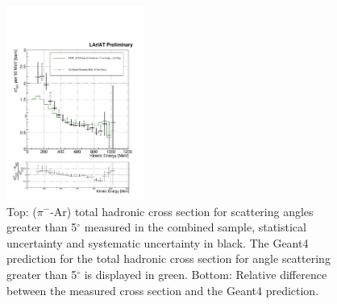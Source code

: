 \documentclass[aps,prl,twocolumn,showpacs,superscriptaddress,groupedaddress]{revtex4}  %
\begin{document}
\begin{figure}
\includegraphics[width =0.4\textwidth ]{TheRealMoneyPlot}
\caption{\label{fig:epsart} Top: ($\pi^-$-Ar) total hadronic cross section for  scattering angles greater than 5$^\circ$ measured in the combined sample, statistical uncertainty and systematic uncertainty in black. The Geant4 prediction for the total hadronic cross section for angle scattering greater than 5$^\circ$ is displayed in green. Bottom: Relative difference between the measured cross section and the Geant4 prediction. }
\end{figure}
\end{document}

